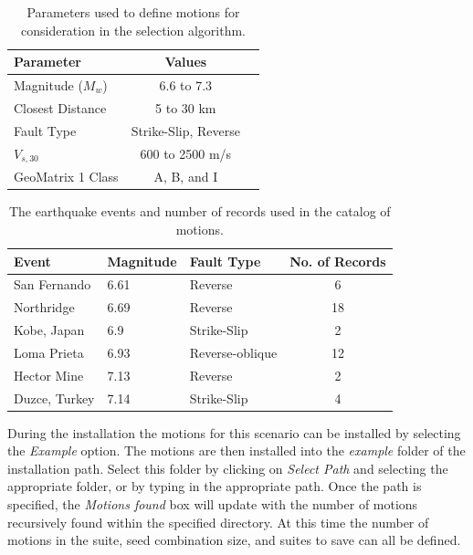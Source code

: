 \documentclass[11pt]{article}
\begin{document}
\begin{table}[tb]
  \centering
  \begin{tabular}{lcc}
	\hline\hline
	\textbf{Parameter} & \textbf{Values}\\
	\hline
	Magnitude ($M_w$)		& 6.6 to 7.3 \\
	Closest Distance		& 5 to 30 km \\
	Fault Type				& Strike-Slip, Reverse \\
	$V_{s,30}$				& 600 to 2500 m/s \\
	GeoMatrix 1 Class		& A, B, and I \\
	\hline\hline
  \end{tabular}
  \caption{Parameters used to define motions for consideration in the selection algorithm.}
  \label{tab:motSearchSummary}
\end{table}

\begin{table}[tb]
  \centering
  \begin{tabular}{lllc}
	\hline\hline
	\textbf{Event} & \textbf{Magnitude} & \textbf{Fault Type} & \textbf{No. of Records} \\
	\hline
	San Fernando			& 6.61	& Reverse 			& 6 \\
	Northridge				& 6.69	& Reverse			& 18 \\
	Kobe, Japan				& 6.9	& Strike-Slip		& 2 \\
	Loma Prieta				& 6.93	& Reverse-oblique	& 12 \\
	Hector Mine				& 7.13  & Reverse			& 2 \\
	Duzce, Turkey 			& 7.14	& Strike-Slip		& 4 \\
	\hline\hline
  \end{tabular}
  \caption{The earthquake events and number of records used in the catalog of motions.}
  \label{tab:motSearchResults}
\end{table}

During the installation the motions for this scenario can be installed by
selecting the \emph{Example} option. The motions are then installed into the
\emph{example} folder of the installation path. Select this folder by clicking
on \emph{Select Path} and selecting the appropriate folder, or by typing in
the appropriate path. Once the path is specified, the \emph{Motions found} box
will update with the number of motions recursively found within the specified
directory. At this time the number of motions in the suite, seed combination
size, and suites to save can all be defined.
\end{document}
